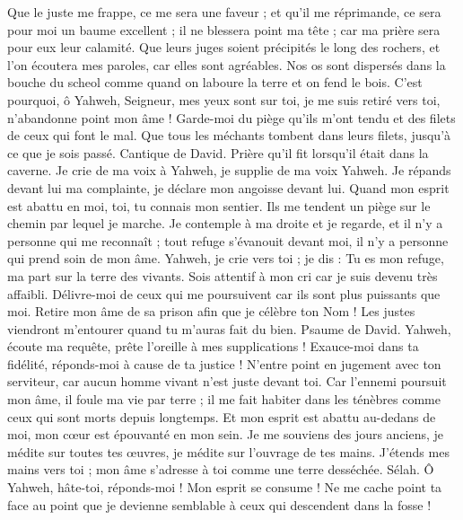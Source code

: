 \begin{multicols}{2}
Que le juste me frappe, ce me sera une faveur ; et qu'il me réprimande, ce sera pour moi un baume excellent ; il ne blessera point ma tête ; car ma prière sera pour eux leur calamité.
Que leurs juges soient précipités le long des rochers, et l'on écoutera mes paroles, car elles sont agréables.
Nos os sont dispersés dans la bouche du scheol comme quand on laboure la terre et on fend le bois.
C'est pourquoi, ô Yahweh, Seigneur, mes yeux sont sur toi, je me suis retiré vers toi, n'abandonne point mon âme !
Garde-moi du piège qu'ils m'ont tendu et des filets de ceux qui font le mal.
Que tous les méchants tombent dans leurs filets, jusqu'à ce que je sois passé.
\VerseOne{}Cantique de David. Prière qu'il fit lorsqu'il était dans la caverne.
Je crie de ma voix à Yahweh, je supplie de ma voix Yahweh.
Je répands devant lui ma complainte, je déclare mon angoisse devant lui.
Quand mon esprit est abattu en moi, toi, tu connais mon sentier. Ils me tendent un piège sur le chemin par lequel je marche.
Je contemple à ma droite et je regarde, et il n'y a personne qui me reconnaît ; tout refuge s'évanouit devant moi, il n'y a personne qui prend soin de mon âme.
Yahweh, je crie vers toi ; je dis : Tu es mon refuge, ma part sur la terre des vivants.
Sois attentif à mon cri car je suis devenu très affaibli. Délivre-moi de ceux qui me poursuivent car ils sont plus puissants que moi.
Retire mon âme de sa prison afin que je célèbre ton Nom ! Les justes viendront m'entourer quand tu m'auras fait du bien.
\VerseOne{}Psaume de David. Yahweh, écoute ma requête, prête l'oreille à mes supplications ! Exauce-moi dans ta fidélité, réponds-moi à cause de ta justice !
N'entre point en jugement avec ton serviteur, car aucun homme vivant n'est juste devant toi.
Car l'ennemi poursuit mon âme, il foule ma vie par terre ; il me fait habiter dans les ténèbres comme ceux qui sont morts depuis longtemps.
Et mon esprit est abattu au-dedans de moi, mon cœur est épouvanté en mon sein.
Je me souviens des jours anciens, je médite sur toutes tes œuvres, je médite sur l'ouvrage de tes mains.
J'étends mes mains vers toi ; mon âme s'adresse à toi comme une terre desséchée. Sélah.
Ô Yahweh, hâte-toi, réponds-moi ! Mon esprit se consume ! Ne me cache point ta face au point que je devienne semblable à ceux qui descendent dans la fosse !

\end{multicols}
